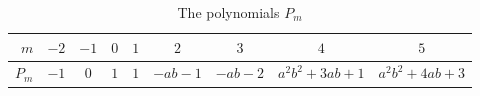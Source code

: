 \documentclass[ALCO,ThmDefs,Unicode,epreuves]{cedram}
\begin{document}
\begin{table}[ht]
\renewcommand{\arraystretch}{1.2}
\begin{tabular}{|r|||c|c|c|c|c|c|c|c|}
\hline
$m$&$-2$&$-1$&$0$&$1$&$2$&$3$&$4$&$5$\\\hline\hline
$P_m$&	$-1$	&$0$	&$1$	&$1$	&$-ab-1$&$-ab-2$&$a^2b^2+3ab+1$	&$a^2b^2+4ab+3$	\\\hline
\end{tabular}\\[3pt]
\caption{The polynomials $P_m$}
\label{pm table}
\end{table}
\end{document}
